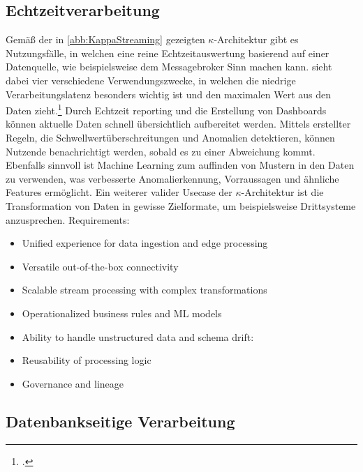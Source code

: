 \subsection{Echtzeitverarbeitung}
Gemäß der in \autoref{abb:KappaStreaming} gezeigten $\kappa$-Architektur gibt es Nutzungsfälle, in welchen eine reine Echtzeitauswertung basierend auf einer Datenquelle, wie beispielsweise dem Messagebroker Sinn machen kann. \citeauthor{Belur.2020} sieht dabei vier verschiedene Verwendungszwecke, in welchen die niedrige Verarbeitungslatenz besonders wichtig ist und den maximalen Wert aus den Daten zieht.\footcite[Vgl. auch im Folgenden][]{Belur.2020} Durch Echtzeit reporting und die Erstellung von Dashboards können aktuelle Daten schnell übersichtlich aufbereitet werden. Mittels erstellter Regeln, die Schwellwertüberschreitungen und Anomalien detektieren, können Nutzende benachrichtigt werden, sobald es zu einer Abweichung kommt. Ebenfalls sinnvoll ist Machine Learning zum auffinden von Mustern in den Daten zu verwenden, was verbesserte Anomalierkennung, Vorraussagen und ähnliche Features ermöglicht. Ein weiterer valider Usecase der $\kappa$-Architektur ist die Transformation von Daten in gewisse Zielformate, um beispielsweise Drittsysteme anzusprechen.
Requirements:
\begin{itemize}
\item Unified experience for data ingestion and edge processing
\item Versatile out-of-the-box connectivity
\item Scalable stream processing with complex transformations
\item Operationalized business rules and ML models
\item Ability to handle unstructured data and schema drift:
\item Reusability of processing logic
\item Governance and lineage
\end{itemize}


\subsection{Datenbankseitige Verarbeitung}
